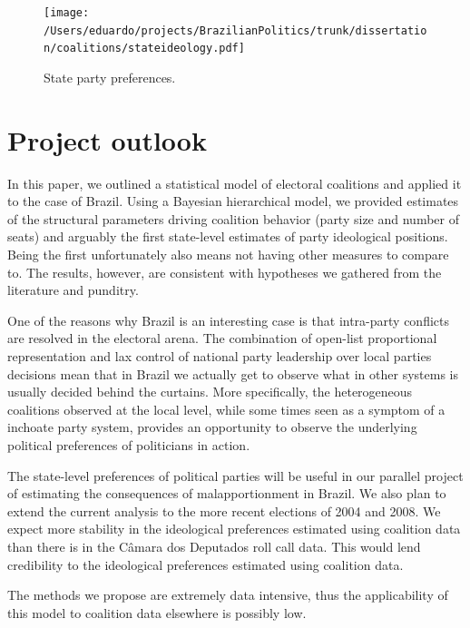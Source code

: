 \begin{figure}
  \centering
  \texttt{[image: /Users/eduardo/projects/BrazilianPolitics/trunk/dissertation/coalitions/stateideology.pdf]} 
  \caption{State party preferences. }
  \label{fig:stateideology}
\end{figure}


\section{Project outlook}
\label{sec:concl-proj-outl}

In this paper, we outlined a statistical model of electoral coalitions and applied it to the case of Brazil. Using a Bayesian hierarchical model, we provided estimates of the structural parameters driving coalition behavior (party size and number of seats) and arguably the first state-level estimates of party ideological positions. Being the first unfortunately also means not having other measures to compare to. The results, however, are  consistent with hypotheses we gathered from the literature and punditry. 

One of the reasons why Brazil is an interesting case is that intra-party conflicts are resolved in the electoral arena. The combination of open-list proportional representation and lax control of national party leadership over local parties decisions mean that in Brazil we actually get to observe what in other systems is usually decided behind the curtains. More specifically, the heterogeneous  coalitions observed at the local level, while some times seen as a symptom of a inchoate party system,  provides an opportunity to observe the underlying political preferences of politicians in action. 

The state-level preferences of political parties will be useful in our parallel project of estimating the consequences of malapportionment in Brazil. We also plan to extend the current analysis to the more recent elections of 2004 and 2008. We expect more stability in the ideological preferences estimated using coalition data than there is in the Câmara dos Deputados roll call data. This would lend credibility to the ideological preferences estimated using coalition data.

The methods we propose are extremely data intensive, thus the applicability  of this model to coalition data elsewhere is possibly low.   

%   


